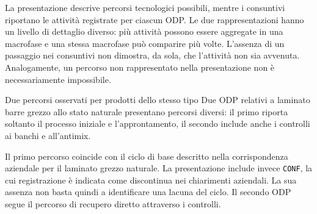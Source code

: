 La presentazione descrive percorsi tecnologici possibili, mentre i consuntivi riportano le attività registrate per ciascun ODP. Le due rappresentazioni hanno un livello di dettaglio diverso: più attività possono essere aggregate in una macrofase e una stessa macrofase può comparire più volte. L'assenza di un passaggio nei consuntivi non dimostra, da sola, che l'attività non sia avvenuta. Analogamente, un percorso non rappresentato nella presentazione non è necessariamente impossibile.

\begin{examplebox}{Due percorsi osservati per prodotti dello stesso tipo}
Due ODP relativi a laminato barre grezzo allo stato naturale presentano percorsi diversi: il primo riporta soltanto il processo iniziale e l'approntamento, il secondo include anche i controlli ai banchi e all'antimix.

\begin{center}
\end{center}

Il primo percorso coincide con il ciclo di base descritto nella corrispondenza aziendale per il laminato grezzo naturale. La presentazione include invece \texttt{CONF}, la cui registrazione è indicata come discontinua nei chiarimenti aziendali. La sua assenza non basta quindi a identificare una lacuna del ciclo. Il secondo ODP segue il percorso di recupero diretto attraverso i controlli.
\end{examplebox}
